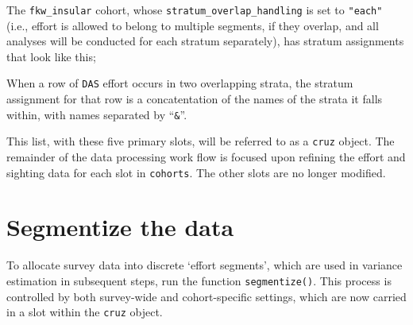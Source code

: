 \documentclass[
]{book}
\newenvironment{Shaded}{\begin{snugshade}}{\end{snugshade}}
\newcommand{\DataTypeTok}[1]{\textcolor[rgb]{0.13,0.29,0.53}{#1}}
\newcommand{\DecValTok}[1]{\textcolor[rgb]{0.00,0.00,0.81}{#1}}
\newcommand{\KeywordTok}[1]{\textcolor[rgb]{0.13,0.29,0.53}{\textbf{#1}}}
\newcommand{\NormalTok}[1]{#1}
\newcommand{\OperatorTok}[1]{\textcolor[rgb]{0.81,0.36,0.00}{\textbf{#1}}}
\newcommand{\StringTok}[1]{\textcolor[rgb]{0.31,0.60,0.02}{#1}}
\begin{document}
\begin{Shaded}
\end{Shaded}

The \texttt{fkw\_insular} cohort, whose \texttt{stratum\_overlap\_handling} is set to \texttt{"each"} (i.e., effort is allowed to belong to multiple segments, if they overlap, and all analyses will be conducted for each stratum separately), has stratum assignments that look like this;

\begin{Shaded}
\end{Shaded}

When a row of \texttt{DAS} effort occurs in two overlapping strata, the stratum assignment for that row is a concatentation of the names of the strata it falls within, with names separated by ``\texttt{\&}''.

This list, with these five primary slots, will be referred to as a \texttt{cruz} object. The remainder of the data processing work flow is focused upon refining the effort and sighting data for each slot in \texttt{cohorts}. The other slots are no longer modified.

\hypertarget{segmentize-the-data}{%
\section*{Segmentize the data}\label{segmentize-the-data}}

To allocate survey data into discrete `effort segments', which are used in variance estimation in subsequent steps, run the function \texttt{segmentize()}. This process is controlled by both survey-wide and cohort-specific \protect\hypertarget{settings}{}{settings}, which are now carried in a slot within the \texttt{cruz} object.
\end{document}
